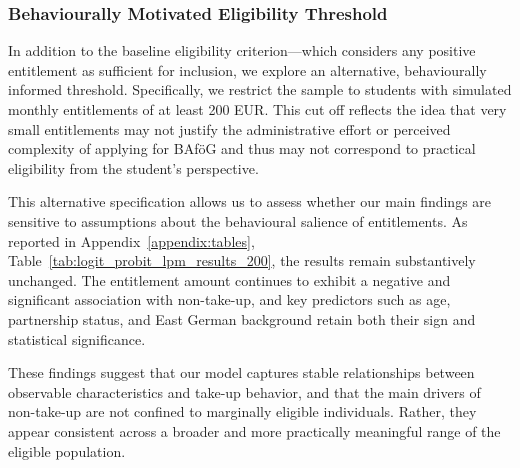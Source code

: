 \subsubsection{Behaviourally Motivated Eligibility Threshold}
In addition to the baseline eligibility criterion—which considers any positive entitlement as sufficient for inclusion, we explore an alternative, behaviourally informed threshold. 
Specifically, we restrict the sample to students with simulated monthly entitlements of at least 200 EUR. 
This cut off reflects the idea that very small entitlements may not justify the administrative effort or perceived complexity of applying for BAföG and thus may not correspond to practical eligibility from the student’s perspective.

This alternative specification allows us to assess whether our main findings are sensitive to assumptions about the behavioural salience of entitlements. 
As reported in Appendix~\ref{appendix:tables}, Table~\ref{tab:logit_probit_lpm_results_200}, the results remain substantively unchanged. 
The entitlement amount continues to exhibit a negative and significant association with non-take-up, and key predictors such as age, partnership status, and East German background retain both their sign and statistical significance.

These findings suggest that our model captures stable relationships between observable characteristics and take-up behavior, and that the main drivers of non-take-up are not confined to marginally eligible individuals. 
Rather, they appear consistent across a broader and more practically meaningful range of the eligible population.
